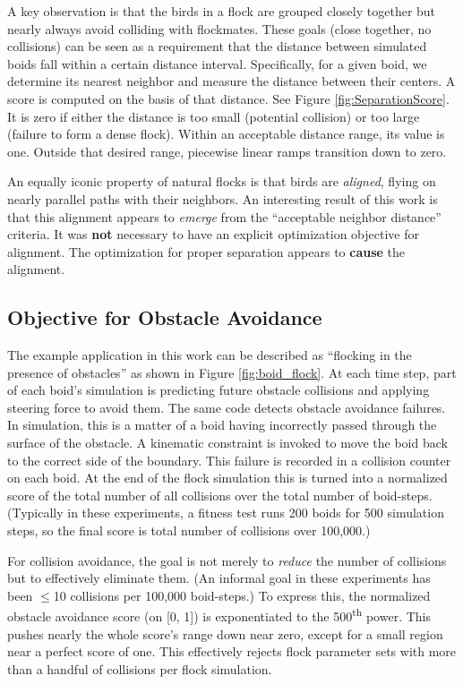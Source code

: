 \documentclass[letterpaper]{article}
\begin{document}
A key observation is that the birds in a flock are grouped closely together but nearly always avoid colliding with flockmates. These goals (close together, no collisions) can be seen as a requirement that the distance between simulated boids fall within a certain distance interval. Specifically, for a given boid, we determine its nearest neighbor and measure the distance between their centers. A score is computed on the basis of that distance. See Figure \ref{fig:SeparationScore}. It is zero if either the distance is too small (potential collision) or too large (failure to form a dense flock). Within an acceptable distance range, its value is one. Outside that desired range, piecewise linear ramps transition down to zero.

An equally iconic property of natural flocks is that birds are \textit{aligned}, flying on nearly parallel paths with their neighbors. An interesting result of this work is that this alignment appears to \textit{emerge} from the ``acceptable neighbor distance'' criteria. It was \textbf{not} necessary to have an explicit optimization objective for alignment. The optimization for proper separation appears to \textbf{cause} the alignment.

\subsection{Objective for Obstacle Avoidance}
\label{subsec:avoidance_objective}

The example application in this work can be described as ``flocking in the presence of obstacles'' as shown in Figure \ref{fig:boid_flock}. At each time step, part of each boid's simulation is predicting future obstacle collisions and applying steering force to avoid them. The same code detects obstacle avoidance failures. In simulation, this is a matter of a boid having incorrectly passed through the surface of the obstacle. A kinematic constraint is invoked to move the boid back to the correct side of the boundary. This failure is recorded in a collision counter on each boid. At the end of the flock simulation this is turned into a normalized score of the total number of all collisions over the total number of boid-steps. (Typically in these experiments, a fitness test runs 200 boids for 500 simulation steps, so the final score is total number of collisions over 100,000.) 

For collision avoidance, the goal is not merely to \textit{reduce} the number of collisions but to effectively eliminate them. (An informal goal in these experiments has been {$\leq$}10 collisions per 100,000 boid-steps.) To express this, the normalized obstacle avoidance score (on [0, 1]) is exponentiated to the 500\textsuperscript{th} power. This pushes nearly the whole score's range down near zero, except for a small region near a perfect score of one. This effectively rejects flock parameter sets with more than a handful of collisions per flock simulation.
\end{document}
